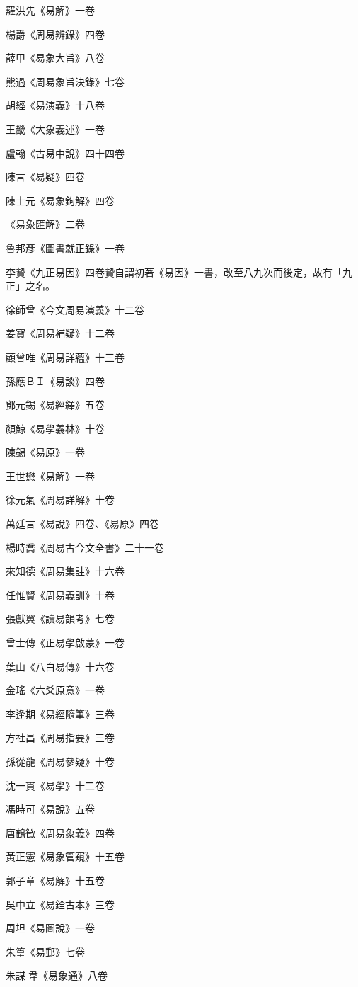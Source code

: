 羅洪先《易解》一卷

楊爵《周易辨錄》四卷

薛甲《易象大旨》八卷

熊過《周易象旨決錄》七卷

胡經《易演義》十八卷

王畿《大象義述》一卷

盧翰《古易中說》四十四卷

陳言《易疑》四卷

陳士元《易象鉤解》四卷

《易象匯解》二卷

魯邦彥《圖書就正錄》一卷

李贄《九正易因》四卷贄自謂初著《易因》一書，改至八九次而後定，故有「九正」之名。

徐師曾《今文周易演義》十二卷

姜寶《周易補疑》十二卷

顧曾唯《周易詳蘊》十三卷

孫應ＢＩ《易談》四卷

鄧元錫《易經繹》五卷

顏鯨《易學義林》十卷

陳錫《易原》一卷

王世懋《易解》一卷

徐元氣《周易詳解》十卷

萬廷言《易說》四卷、《易原》四卷

楊時喬《周易古今文全書》二十一卷

來知德《周易集註》十六卷

任惟賢《周易義訓》十卷

張獻翼《讀易韻考》七卷

曾士傳《正易學啟蒙》一卷

葉山《八白易傳》十六卷

金瑤《六爻原意》一卷

李逢期《易經隨筆》三卷

方社昌《周易指要》三卷

孫從龍《周易參疑》十卷

沈一貫《易學》十二卷

馮時可《易說》五卷

唐鶴徵《周易象義》四卷

黃正憲《易象管窺》十五卷

郭子章《易解》十五卷

吳中立《易銓古本》三卷

周坦《易圖說》一卷

朱篁《易郵》七卷

朱謀韋《易象通》八卷


